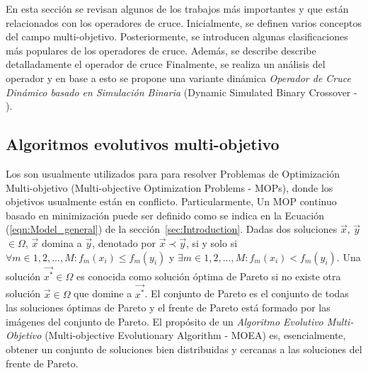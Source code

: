 En esta sección se revisan algunos de los trabajos más importantes y que están relacionados con los operadores de cruce.
%
%
Inicialmente, se definen varios conceptos del campo multi-objetivo.
%
Posteriormente, se introducen algunas clasificaciones más populares de los operadores de cruce.
%
Además, se describe describe detalladamente el operador de cruce \SBX{}
%
Finalmente, se realiza un análisis del operador \SBX{} y en base a esto se propone una variante dinámica \textit{Operador de Cruce Dinámico basado en Simulación Binaria} (Dynamic Simulated Binary Crossover - \DSBX{}).
%


\subsection{Algoritmos evolutivos multi-objetivo}

Los \EAS{} son usualmente utilizados para para resolver Problemas de Optimización Multi-objetivo (Multi-objective Optimization Problems - MOPs), donde los objetivos usualmente están en conflicto.
%
Particularmente, Un MOP continuo basado en minimización puede ser definido como se indica en la Ecuación (\ref{eqn:Model_general}) de la sección~\ref{sec:Introduction}.
%
Dadas dos soluciones $\vec{x}$, $\vec{y}$ $\in \Omega$, $\vec{x}$ domina a $\vec{y}$, denotado por $\vec{x} \prec \vec{y}$, si y solo si $\forall m \in {1,2,...,M} : f_m(x_i) \leq f_m(y_i)$ y $\exists m \in {1,2,...,M} : f_m(x_i) < f_m(y_i)$.
%
Una solución $\vec{x^*} \in \Omega$ es conocida como solución óptima de Pareto si no existe otra solución $\vec{x} \in \Omega$ que domine a $\vec{x^*}$.
%
El conjunto de Pareto es el conjunto de todas las soluciones óptimas de Pareto y el frente de Pareto está formado por las imágenes del conjunto de Pareto.
%
El propósito de un \textit{Algoritmo Evolutivo Multi-Objetivo} (Multi-objective Evolutionary Algorithm - MOEA) es, esencialmente, obtener un conjunto de soluciones bien distribuidas y cercanas a las soluciones del frente de Pareto.
%


